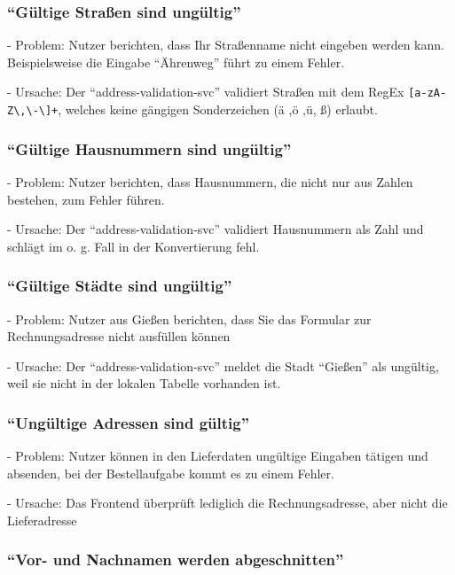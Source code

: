 \subsubsection{\enquote{Gültige Straßen sind ungültig}}

- Problem: Nutzer berichten, dass Ihr Straßenname nicht eingeben werden kann. Beispielsweise die Eingabe \enquote{Ährenweg} führt zu einem Fehler.

- Ursache: Der \enquote{address-validation-svc} validiert Straßen mit dem RegEx \texttt{[a-zA-Z\textbackslash,\textbackslash-\textbackslash ]+}, welches keine gängigen Sonderzeichen (ä ,ö ,ü, ß) erlaubt.

\subsubsection{\enquote{Gültige Hausnummern sind ungültig}}

- Problem: Nutzer berichten, dass Hausnummern, die nicht nur aus Zahlen bestehen, zum Fehler führen.

- Ursache: Der \enquote{address-validation-svc} validiert Hausnummern als Zahl und schlägt im o. g. Fall in der Konvertierung fehl.

\subsubsection{\enquote{Gültige Städte sind ungültig}}

- Problem: Nutzer aus Gießen berichten, dass Sie das Formular zur Rechnungsadresse nicht ausfüllen können

- Ursache: Der \enquote{address-validation-svc} meldet die Stadt \enquote{Gießen} als ungültig, weil sie nicht in der lokalen Tabelle vorhanden ist.

\subsubsection{\enquote{Ungültige Adressen sind gültig}}

- Problem: Nutzer können in den Lieferdaten ungültige Eingaben tätigen und absenden, bei der Bestellaufgabe kommt es zu einem Fehler.

- Ursache: Das Frontend überprüft lediglich die Rechnungsadresse, aber nicht die Lieferadresse

\subsubsection{\enquote{Vor- und Nachnamen werden abgeschnitten}}

